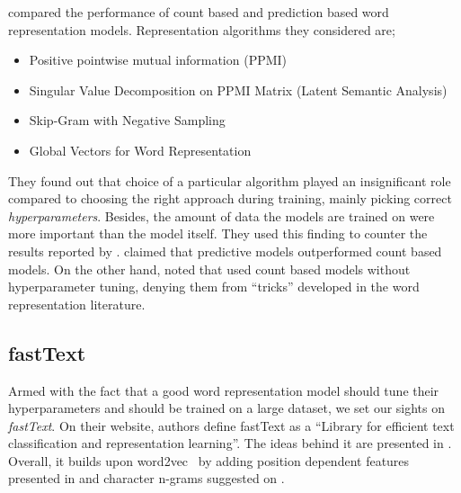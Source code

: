 
\textcite{levy_improving_2015} compared the performance of count based and prediction based word representation models.
Representation algorithms they considered are;
\begin{itemize}
    \item Positive pointwise mutual information (PPMI)~\cite{church_word_1990, bullinaria_extracting_2007}
    \item Singular Value Decomposition on PPMI Matrix (Latent Semantic Analysis)~\cite{deerwester_indexing_1990}
    \item Skip-Gram with Negative Sampling~\cite{mikolov_distributed_2013}
    \item Global Vectors for Word Representation~\cite{pennington_glove_2014}
\end{itemize}
They found out that choice of a particular algorithm played an insignificant role compared to choosing the right approach during training, mainly picking correct \emph{hyperparameters}.
Besides, the amount of data the models are trained on were more important than the model itself.
They used this finding to counter the results reported by \textcite{baroni_dont_2014}.
\citeauthor{baroni_dont_2014} claimed that predictive models outperformed count based models.
On the other hand, \citeauthor{levy_improving_2015} noted that \citeauthor{baroni_dont_2014} used count based models without hyperparameter tuning, denying them from \enquote{tricks} developed in the word representation literature.

\subsection{fastText}%
\label{sub:fasttext}

Armed with the fact that a good word representation model should tune their hyperparameters and should be trained on a large dataset, we set our sights on \emph{fastText}.
On their website, authors define fastText as a \enquote{Library for efficient text classification and representation learning}.
The ideas behind it are presented in \textcite{mikolov2018advances}.
Overall, it builds upon word2vec~\cite{mikolov_distributed_2013} by adding position dependent features presented in \textcite{mnih_learning_2013} and character n-grams suggested on \textcite{bojanowski_enriching_2016}.

